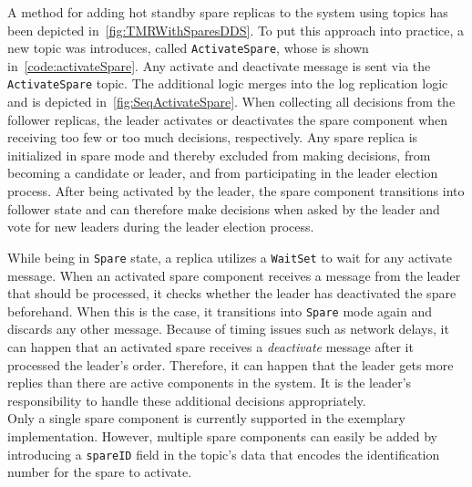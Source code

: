 A method for adding hot standby spare replicas to the system using  topics has been depicted in~\autoref{fig:TMRWithSparesDDS}.
To put this approach into practice, a new topic was introduces, called \texttt{ActivateSpare}, whose  is shown in~\autoref{code:activateSpare}.
Any activate and deactivate message is sent via the \texttt{ActivateSpare} topic.
The additional logic merges into the log replication logic and is depicted in~\autoref{fig:SeqActivateSpare}.
When collecting all decisions from the follower replicas, the leader activates or deactivates the spare component when receiving too few or too much decisions, respectively.
Any spare replica is initialized in spare mode and thereby excluded from making decisions, from becoming a candidate or leader, and from participating in the leader election process.
After being activated by the leader, the spare component transitions into follower state and can therefore make decisions when asked by the leader and vote for new leaders during the leader election process.

While being in \texttt{Spare} state, a replica utilizes a \texttt{WaitSet} to wait for any activate message.
When an activated spare component receives a message from the leader that should be processed, it checks whether the leader has deactivated the spare beforehand.
When this is the case, it transitions into \texttt{Spare} mode again and discards any other message.
Because of timing issues such as network delays, it can happen that an activated spare receives a \textit{deactivate} message after it processed the leader's order.
Therefore, it can happen that the leader gets more replies than there are active components in the system.
It is the leader's responsibility to handle these additional decisions appropriately.
\\

Only a single spare component is currently supported in the exemplary implementation.
However, multiple spare components can easily be added by introducing a \texttt{spareID} field in the topic's data that encodes the identification number for the spare to activate.

